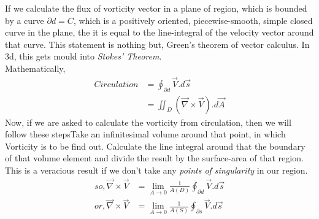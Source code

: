\documentclass{book}
\begin{document}
If we calculate the flux of vorticity vector in a plane of region, which is bounded by a curve ${\partial d}=C$, which is a positively oriented, piecewise-smooth, simple closed curve in the plane, the it is equal to the line-integral of the velocity vector around that curve. This statement is nothing but, Green's theorem of vector calculus. In 3d, this gets mould into \emph{Stokes' Theorem}.\\
Mathematically, 
\begin{equation}
\begin{split}
Circulation &=\oint_{\partial d}\vec{V}.d\vec{s} \\
&=\iint_{D}(\vec{\nabla}\times \vec{V}).d\vec{A}
\end{split}
\end{equation}
Now, if we are asked to calculate the vorticity from circulation, then we will follow these steps\textemdash Take an infinitesimal volume around that point, in which Vorticity is to be find out. Calculate the line integral around that the boundary of that volume element and divide the result by the surface-area of that region. This is a veracious result if we don't take any \emph{points of singularity} in our region.
\begin{equation*}
\begin{split}
so, \vec{\nabla}\times \vec{V}&=\lim_{A \to 0}\frac{1}{A(D)}\oint_{\partial d}\vec{V}.d\vec{s}\\
or, \vec{\nabla}\times \vec{V}&=\lim_{A \to 0}\frac{1}{A(S)}\oint_{\partial s}\vec{V}.d\vec{s}\\
\end{split}
\end{equation*}
\end{document}
